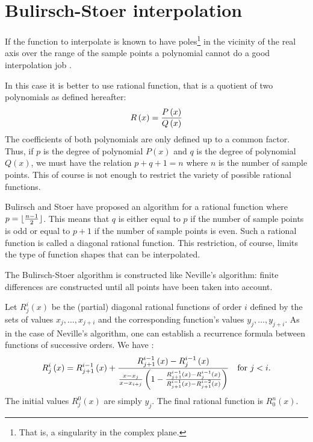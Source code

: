 \section{Bulirsch-Stoer interpolation}
If the function to interpolate is known to have
poles\footnote{That is, a singularity in the complex plane.} in
the vicinity of the real axis over the range of the sample points
a polynomial cannot do a good interpolation job \cite{Press}.

In this case it is better to use rational function, that is a
quotient of two polynomials as defined hereafter:
\begin{equation}
R\left(x\right)={P\left(x\right)\over Q\left(x\right)}
\end{equation}
The coefficients of both polynomials are only defined up to a
common factor. Thus, if $p$ is the degree of polynomial
$P\left(x\right)$ and $q$ is the degree of polynomial
$Q\left(x\right)$, we must have the relation $p+q+1 = n$ where $n$
is the number of sample points. This of course is not enough to
restrict the variety of possible rational functions.

Bulirsch and Stoer have proposed an algorithm for a rational
function where $p=\lfloor{n-1 \over 2}\rfloor$. This means that
$q$ is either equal to $p$ if the number of sample points is odd
or equal to $p+1$ if the number of sample points is even. Such a
rational function is called a diagonal rational function. This
restriction, of course, limits the type of function shapes that
can be interpolated.

The Bulirsch-Stoer algorithm is constructed like Neville's
algorithm: finite differences are constructed until all points
have been taken into account.

Let $R_j^i\left(x\right)$ be the (partial) diagonal rational
functions of order $i$ defined by the sets of values
$x_j,\ldots,x_{j+i}$ and the corresponding function's values
$y_j,\ldots,y_{j+i}$. As in the case of Neville's algorithm, one
can establish a recurrence formula between functions of successive
orders. We have \cite{Press}:
\begin{equation}
\label{eq:bustoer}
R_j^i\left(x\right)=R_{j+1}^{i-1}\left(x\right)+
{R_{j+1}^{i-1}\left(x\right) - R_j^{i-1}\left(x\right) \over
{x-x_j\over x-x_{i+j}}\left(1-{R_{j+1}^{i-1}\left(x\right)
-R_j^{i-1}\left(x\right)\over R_{j+1}^{i-1}\left(x\right)
-R_{j+1}^{i-2}\left(x\right)}\right)}\mbox{\quad for $j<i$}.
\end{equation}
The initial values $R_j^0\left(x\right)$ are simply $y_j$. The
final rational function is $R_0^n\left(x\right)$.

